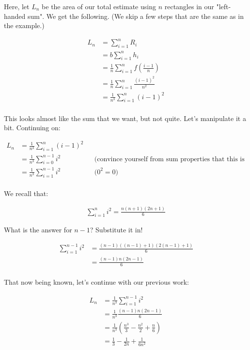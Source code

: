 \documentclass{book}
\begin{document}


Here, let $L_n$ be the area of our total estimate using $n$ rectangles in our "left-handed sum". We get the following. (We skip a few steps that are the same as in the example.)

\begin{align*}
L_n &= \sum_{i=1}^n R_i \\
&= b \sum_{i=1}^n h_i \\
&= \frac{1}{n} \sum_{i=1}^n f(\frac{i-1}{n}) \\
&= \frac{1}{n} \sum_{i=1}^n \frac{(i-1)^2}{n^2} \\
&= \frac{1}{n^3} \sum_{i=1}^n (i-1)^2 \\
\end{align*}

This looks almost like the sum that we want, but not quite. Let's manipulate it a bit. Continuing on: 


\begin{align*}
L_n &= \frac{1}{n^3} \sum_{i=1}^n (i-1)^2 \\
&= \frac{1}{n^3} \sum_{i=0}^{n-1} i^2 && \text{(convince yourself from sum properties that this is true)} \\
&= \frac{1}{n^3} \sum_{i=1}^{n-1} i^2 && \text{($0^2 = 0$)} \\
\end{align*}

We recall that:

\begin{align*}
\sum_{i=1}^n i^2 = \frac{n(n+1)(2n+1)}{6}
\end{align*}

What is the answer for $n-1$? Substitute it in!

\begin{align*}
\sum_{i=1}^{n-1} i^2 &= \frac{(n-1)((n-1)+1)(2(n-1)+1)}{6} \\
&= \frac{(n-1)n(2n-1)}{6} \\
\end{align*}


That now being known, let's continue with our previous work:

\begin{align*}
L_n &= \frac{1}{n^3} \sum_{i=1}^{n-1} i^2 \\
&= \frac{1}{n^3} \frac{(n-1)n(2n-1)}{6} \\
&= \frac{1}{n^3} \left( \frac{n^3}{3} - \frac{n^2}{2} + \frac{n}{6} \right) \\
&= \frac{1}{3} - \frac{1}{2n} + \frac{1}{6n^2}
\end{align*}
\end{document}
